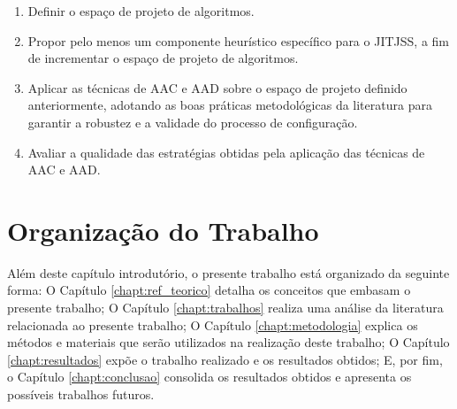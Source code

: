 \begin{enumerate}
  \item Definir o espaço de projeto de algoritmos.
  \item Propor pelo menos um componente heurístico específico para o \ac{JITJSS}, a fim de incrementar o espaço de projeto de algoritmos.
  \item Aplicar as técnicas de \ac{AAC} e \ac{AAD} sobre o espaço de projeto definido anteriormente, adotando as boas práticas metodológicas da literatura para garantir a robustez e a validade do processo de configuração.
  \item Avaliar a qualidade das estratégias obtidas pela aplicação das técnicas de \ac{AAC} e \ac{AAD}.
\end{enumerate}

\section{Organização do Trabalho}

Além deste capítulo introdutório, o presente trabalho está organizado da seguinte forma: O Capítulo \ref{chapt:ref_teorico} detalha os conceitos que embasam o presente trabalho; O Capítulo \ref{chapt:trabalhos} realiza uma análise da literatura relacionada ao presente trabalho; O Capítulo \ref{chapt:metodologia} explica os métodos e materiais que serão utilizados na realização deste trabalho; O Capítulo \ref{chapt:resultados} expõe o trabalho realizado e os resultados obtidos; E, por fim, o Capítulo \ref{chapt:conclusao} consolida os resultados obtidos e apresenta os possíveis trabalhos futuros.


